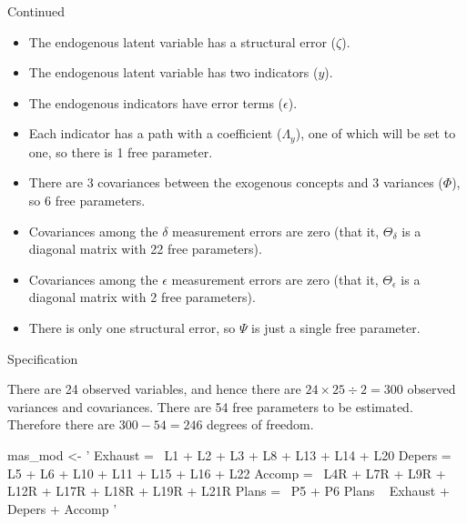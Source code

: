 \documentclass[10pt,ignorenonframetext,]{beamer}
\newenvironment{Shaded}{\begin{snugshade}}{\end{snugshade}}
\newcommand{\StringTok}[1]{\textcolor[rgb]{0.31,0.60,0.02}{{#1}}}
\newcommand{\NormalTok}[1]{{#1}}
\providecommand{\tightlist}{%
\setlength{\itemsep}{0pt}\setlength{\parskip}{0pt}}
\begin{document}
\begin{frame}{Continued}

\begin{itemize}
\tightlist
\item
  The endogenous latent variable has a structural error (\(\zeta\)).
\item
  The endogenous latent variable has two indicators (\(y\)).
\item
  The endogenous indicators have error terms (\(\epsilon\)).
\item
  Each indicator has a path with a coefficient (\(\Lambda_y\)), one of
  which will be set to one, so there is 1 free parameter.
\item
  There are 3 covariances between the exogenous concepts and 3 variances
  (\(\Phi\)), so 6 free parameters.
\item
  Covariances among the \(\delta\) measurement errors are zero (that it,
  \(\Theta_\delta\) is a diagonal matrix with 22 free parameters).
\item
  Covariances among the \(\epsilon\) measurement errors are zero (that
  it, \(\Theta_\epsilon\) is a diagonal matrix with 2 free parameters).
\item
  There is only one structural error, so \(\Psi\) is just a single free
  parameter.
\end{itemize}

\end{frame}

\begin{frame}[fragile]{Specification}

There are 24 observed variables, and hence there are
\(24 \times 25 \div 2 = 300\) observed variances and covariances. There
are 54 free parameters to be estimated. Therefore there are
\(300-54=246\) degrees of freedom. \tiny

\begin{Shaded}
\begin{Highlighting}[]
\NormalTok{mas_mod <-}\StringTok{ ' Exhaust =~ L1 + L2 + L3 + L8 + L13 + L14 + L20}
\StringTok{             Depers =~ L5 + L6 + L10 + L11 + L15 + L16 + L22}
\StringTok{             Accomp =~ L4R + L7R + L9R + L12R + L17R + L18R + L19R + L21R}
\StringTok{             Plans =~ P5 + P6}
\StringTok{             Plans ~ Exhaust + Depers + Accomp '}
\end{Highlighting}
\end{Shaded}

\end{frame}
\end{document}
